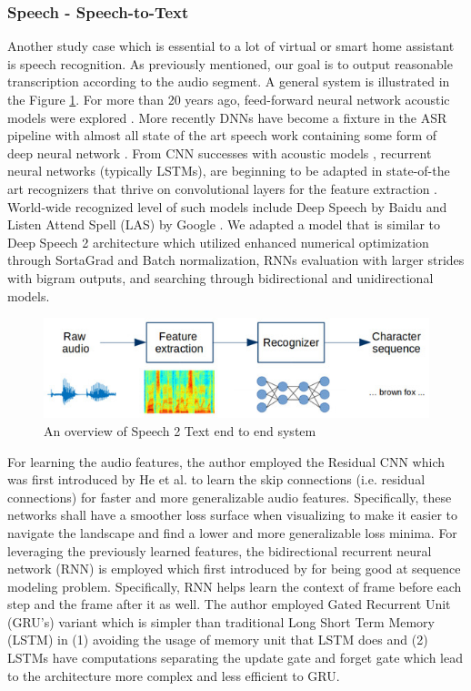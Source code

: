 \subsubsection{Speech - Speech-to-Text}

Another study case which is essential to a lot of virtual or smart home assistant is speech recognition. As previously mentioned, our goal is to output reasonable transcription according to the audio segment. A general system is illustrated in the Figure \ref{fig:speech2text}. For more than 20 years ago, feed-forward
neural network acoustic models were explored \cite{acoustic} \cite{acoustic2}.  More recently DNNs have become a fixture in the ASR pipeline with almost all
state of the art speech work containing some form of deep neural network \cite{DNN}. From CNN successes with acoustic models \cite{CNNacoustics}, recurrent
neural networks (typically LSTMs), are beginning to be adapted in state-of-the art recognizers \cite{recognizers} that thrive on convolutional layers for the feature extraction \cite{featextr}. World-wide recognized level of such models include Deep Speech by Baidu \cite{deepspeech} and Listen Attend Spell (LAS) by Google \cite{LAS}. We adapted a model that is similar to Deep Speech 2 architecture \cite{deepspeech} which utilized enhanced numerical optimization through SortaGrad and Batch normalization, RNNs evaluation with larger strides with bigram outputs, and searching through bidirectional and unidirectional models.


\begin{figure}[!b]
    \centering
    \includegraphics[width=\linewidth]{img/speech2text.jpg}
    \caption{An overview of Speech 2 Text end to end system}
    \label{fig:speech2text}
\end{figure}

For learning the audio features, the author employed the Residual CNN which was first introduced by He et al. \cite{resnet} to learn the skip connections (i.e. residual connections) for faster and more generalizable audio features. Specifically, these networks shall have a smoother loss surface when visualizing to make it easier to navigate the landscape and find a lower and more generalizable loss minima.  For leveraging the previously learned features, the bidirectional recurrent neural network (RNN) is employed which first introduced by for being good at sequence modeling problem. Specifically, RNN helps learn the context of frame before each step and the frame after it as well. The author employed Gated Recurrent Unit (GRU's) variant which is simpler than traditional Long Short Term Memory (LSTM) in (1) avoiding the usage of memory unit that LSTM does and (2)  LSTMs have computations  separating the update gate and forget gate which lead to the architecture more complex and less efficient to GRU. 


